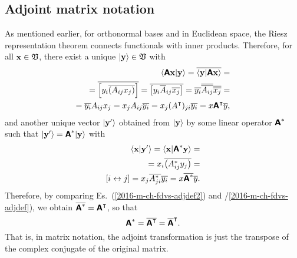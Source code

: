 \subsection{Adjoint matrix notation}

As mentioned earlier, for orthonormal bases and in Euclidean space,  the
{Riesz representation theorem}
connects   functionals
with inner products.
Therefore,  for all ${\bf x}\in {\frak V}$,
there exist a unique $\vert {\bf y} \rangle \in {\frak V}$ with
\begin{equation}
\begin{split}
\langle \textsf{\textbf{A}} {\bf x}\vert {\bf y}\rangle
=\overline{ \langle{\bf y}\vert \textsf{\textbf{A}} {\bf x}\rangle }
= \\
= \overline{ \left[y_i   \overline{ \left( A_{ij}  x_j  \right) }  \right]}
= \overline{ \left[y_i    \overline{ A}_{ij} \overline{ x_j}     \right]}
= \overline{ y_i }    \overline{\overline{ A_{ij} }}  \overline{ \overline{ x_j } }
= \\
= \overline{y_i} A_{ij}  x_j
= x_j A_{ij}  \overline{y_i}
= x_j (A^\intercal )_{ji}  \overline{y_i}
= x  \textsf{\textbf{A}}^\intercal  \overline{ y },
\end{split}
\label{2016-m-ch-fdvs-adjdef}
\end{equation}
and another unique vector $\vert {\bf y}' \rangle $ obtained from $\vert {\bf y} \rangle $ by
some linear operator $\textsf{\textbf{A}}^\ast$
such that $\vert {\bf y}' \rangle =\textsf{\textbf{A}}^\ast \vert {\bf y} \rangle $ with
\begin{equation}
\begin{split}
 \langle {\bf x}\vert {\bf y}'\rangle
= \langle {\bf x}\vert \textsf{\textbf{A}}^\ast {\bf y}\rangle
=\\
= x_i \overline{ \left(A_{ij}^\ast y_j \right) }
=\\
[ i \leftrightarrow j]
= x_j \overline{  A_{ji}^\ast} \overline{  y_i  }
=    x \overline{\textsf{\textbf{A}}^\ast} \overline{y}.
\end{split}
\label{2016-m-ch-fdvs-adjdef2}
\end{equation}
Therefore, by comparing Es.~(\ref{2016-m-ch-fdvs-adjdef2}) and /\ref{2016-m-ch-fdvs-adjdef}),  we obtain $\overline{ \textsf{\textbf{A}}^\ast}=\textsf{\textbf{A}}^\intercal $, so that
\begin{equation}
\textsf{\textbf{A}}^\ast =\overline{\textsf{\textbf{A}}^\intercal } = \overline{\textsf{\textbf{A}}}^\intercal .
\end{equation}
That is, in matrix notation, the adjoint transformation is just the
transpose of the complex conjugate of the original matrix.



